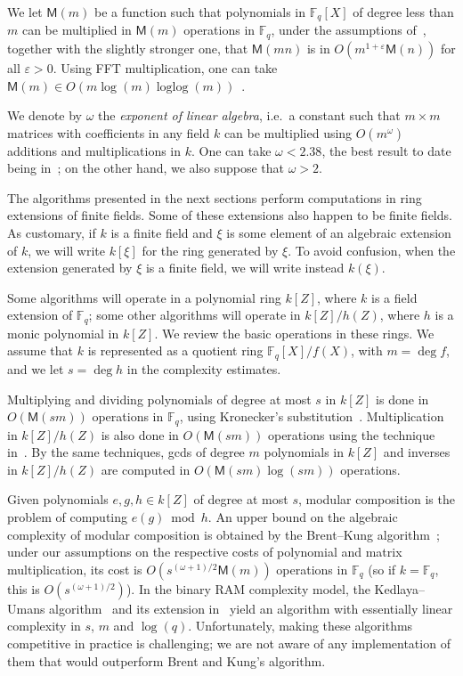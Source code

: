 \documentclass{mcom-l}
\theoremstyle{plain}
\theoremstyle{definition}
\DeclareMathOperator{\loglog}{loglog}
\newcommand{\F}{\ensuremath{\mathbb{F}}}
\newcommand{\MM}{\ensuremath{\mathsf{M}}}
\newcounter{algorithm}
\begin{document}
We let $\MM(m)$ be a function such that polynomials in $\F_q[X]$ of
degree less than $m$ can be multiplied in $\MM(m)$ operations in
$\F_q$, under the assumptions of~\cite[Ch.~8.3]{vzGG}, together with
the slightly stronger one, that $\MM(mn)$ is in $O(m^{1+\varepsilon}
\MM(n))$ for all $\varepsilon > 0$. Using FFT multiplication, one can
take $\MM(m)\in O(m\log(m) \loglog(m))$~\cite{cantor+kaltofen91}.

We denote by $\omega$ the \emph{exponent of linear algebra}, i.e.\ a
constant such that $m\times m$ matrices with coefficients in any field
$k$ can be multiplied using $O(m^\omega)$ additions and
multiplications in $k$. One can take $\omega < 2.38$, the best result
to date being in~\cite{LeGall14}; on the other hand, we also suppose
that $\omega > 2$.

The algorithms presented in the next sections perform computations in
ring extensions of finite fields. Some of these extensions also happen
to be finite fields. As customary, if $k$ is a finite field and $\xi$
is some element of an algebraic extension of $k$, we will write
$k[\xi]$ for the ring generated by $\xi$. To avoid confusion, when the
extension generated by $\xi$ is a finite field, we will write instead
$k(\xi)$.

Some algorithms will operate in a polynomial ring $k[Z]$, where $k$ is
a field extension of $\F_q$; some other algorithms will operate in
$k[Z]/h(Z)$, where $h$ is a monic polynomial in $k[Z]$. We review the
basic operations in these rings. We assume that $k$ is represented as
a quotient ring $\F_q[X]/f(X)$, with $m=\deg f$, and we let $s=\deg h$
in the complexity estimates.

Multiplying and dividing polynomials of degree at most $s$ in $k[Z]$
is done in $O(\MM(sm))$ operations in $\F_q$, using Kronecker's
substitution~\cite{moenck76,kaltofen87,vzGG,vzgathen+shoup92,harvey09}.
Multiplication in $k[Z]/h(Z)$ is also done in $O(\MM(sm))$ operations using the
technique in~\cite{pascal+schost06}. By the same techniques, gcds of
degree $m$ polynomials in $k[Z]$ and inverses in $k[Z]/h(Z)$ are
computed in $O(\MM(sm)\log(sm))$ operations.

Given polynomials $e,g,h \in k[Z]$ of degree at most $s$, modular
composition is the problem of computing $e(g) \bmod h$. An upper bound
on the algebraic complexity of modular composition is obtained by the
Brent--Kung algorithm~\cite{brent+kung}; under our assumptions on the
respective costs of polynomial and matrix multiplication, its cost is
$O(s^{(\omega+1)/2}\MM(m))$ operations in $\F_q$
(so if $k=\F_q$, this is $O(s^{(\omega+1)/2})$). In the binary RAM
complexity model, the Kedlaya--Umans algorithm~\cite{KeUm11} and its
extension in~\cite{PoSc13a} yield an algorithm with essentially linear
complexity in $s$, $m$ and $\log(q)$. Unfortunately, making these
algorithms competitive in practice is challenging; we are not aware of
any implementation of them that would outperform Brent and Kung's
algorithm. 
\end{document}
